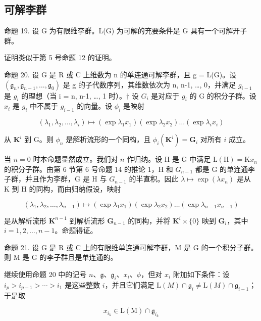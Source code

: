 \subsection{可解李群}

命题 19. 设 G 为有限维李群。L(G) 为可解的充要条件是 G 具有一个可解开子群。

证明类似于第 5 号命题 12 的证明。

命题 20. 设 G 是 R 或 C 上维数为 n 的单连通可解李群，且 g = L(G)。设 \((\mathfrak{g}_{n}, \mathfrak{g}_{n-1}, \ldots, \mathfrak{g}_{0})\) 是 g 的子代数序列，其维数依次为 n, n-1, \ldots, 0，并满足 \(g_{i-1}\) 是 \(g_{i}\) 的理想（当 i = n, n-1, \ldots, 1 时）。† 设 \(G_{i}\) 是对应于 \(g_{i}\) 的 G 的积分子群。设 \(x_{i}\) 是 \(g_{i}\) 中不属于 \(g_{i-1}\) 的向量。设 \(\phi_{i}\) 是映射

\[
\left(\lambda_ {1}, \lambda_ {2}, \dots , \lambda_ {i}\right) \mapsto \left(\exp \lambda_ {1} x _ {1}\right) \left(\exp \lambda_ {2} x _ {2}\right) \dots \left(\exp \lambda_ {i} x _ {i}\right)
\]

从 \(\mathbf{K}^i\) 到 G。则 \(\phi_n\) 是解析流形的一个同构，且 \(\phi_i(\mathbf{K}^i) = \mathbf{G}_i\) 对所有 \(i\) 成立。

当 \(n = 0\) 时本命题显然成立。我们对 \(n\) 作归纳。设 H 是 G 中满足 \(\mathrm{L(H)} = \mathrm{K}x_n\) 的积分子群。由第 6 节第 6 号命题 14 的推论 1，H 和 \(G_{n-1}\) 都是 G 的单连通李子群，并且作为李群，G 是 H 与 \(G_{n-1}\) 的半直积。因此 \(\lambda \mapsto \exp (\lambda x_n)\) 是从 K 到 H 的同构，而由归纳假设，映射

\[
\left(\lambda_ {1}, \lambda_ {2}, \dots , \lambda_ {n - 1}\right) \mapsto \left(\exp \lambda_ {1} x _ {1}\right) \left(\exp \lambda_ {2} x _ {2}\right) \dots \left(\exp \lambda_ {n - 1} x _ {n - 1}\right)
\]

是从解析流形 \(\mathbf{K}^{n - 1}\) 到解析流形 \(\mathbf{G}_{n - 1}\) 的同构，并将 \(\mathbf{K}^i\times \{0\}\) 映到 \(\mathbf{G}_i\)，其中 \(i = 1,2,\ldots ,n - 1\)。命题得证。

命题 21. 设 G 是 R 或 C 上的有限维单连通可解李群，M 是 G 的一个积分子群。则 M 是 G 的李子群且是单连通的。

继续使用命题 20 中的记号 \(n\)、\(\mathfrak{g}\)、\(\mathfrak{g}_{i}\)、\(x_{i}\)、\(\phi\)，但对 \(x_{i}\) 附加如下条件：设 \(i_{p} > i_{p-1} > \cdots > i_{1}\) 是这些整数 \(i\)，并且它们满足 \(\mathrm{L}(M) \cap \mathfrak{g}_{i} \neq \mathrm{L}(M) \cap \mathfrak{g}_{i-1}\)；于是取

\[
x _ {i _ {k}} \in \mathrm{L} (\mathrm{M}) \cap \mathfrak {g} _ {i _ {k}}
\]

